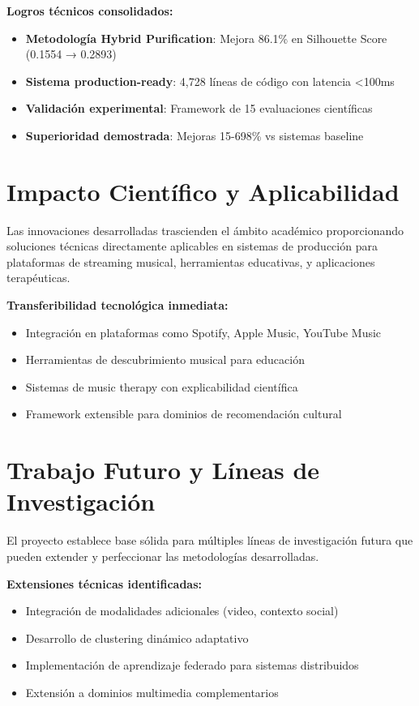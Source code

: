 \documentclass[12pt,a4paper]{report}
\begin{document}
\textbf{Logros técnicos consolidados:}
\begin{itemize}
    \item \textbf{Metodología Hybrid Purification}: Mejora 86.1\% en Silhouette Score (0.1554 → 0.2893)
    \item \textbf{Sistema production-ready}: 4,728 líneas de código con latencia <100ms
    \item \textbf{Validación experimental}: Framework de 15 evaluaciones científicas
    \item \textbf{Superioridad demostrada}: Mejoras 15-698\% vs sistemas baseline
\end{itemize}

\section{Impacto Científico y Aplicabilidad}

Las innovaciones desarrolladas trascienden el ámbito académico proporcionando soluciones técnicas directamente aplicables en sistemas de producción para plataformas de streaming musical, herramientas educativas, y aplicaciones terapéuticas.

\textbf{Transferibilidad tecnológica inmediata:}
\begin{itemize}
    \item Integración en plataformas como Spotify, Apple Music, YouTube Music
    \item Herramientas de descubrimiento musical para educación
    \item Sistemas de music therapy con explicabilidad científica
    \item Framework extensible para dominios de recomendación cultural
\end{itemize}

\section{Trabajo Futuro y Líneas de Investigación}

El proyecto establece base sólida para múltiples líneas de investigación futura que pueden extender y perfeccionar las metodologías desarrolladas.

\textbf{Extensiones técnicas identificadas:}
\begin{itemize}
    \item Integración de modalidades adicionales (video, contexto social)
    \item Desarrollo de clustering dinámico adaptativo
    \item Implementación de aprendizaje federado para sistemas distribuidos
    \item Extensión a dominios multimedia complementarios
\end{itemize}
\end{document}
